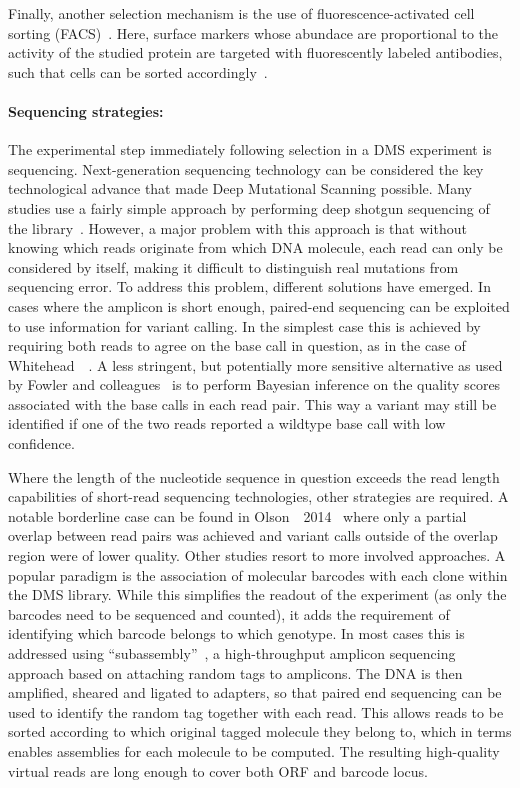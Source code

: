 Finally, another selection mechanism is the use of fluorescence-activated cell sorting (FACS)~. Here, surface markers whose abundace are proportional to the activity of the studied protein are targeted with fluorescently labeled antibodies, such that cells can be sorted accordingly~\cite{schlinkmann_critical_2012,majithia_prospective_2016}.


\paragraph{Sequencing strategies:} The experimental step immediately following selection in a DMS experiment is sequencing. Next-generation sequencing technology can be considered the key technological advance that made Deep Mutational Scanning possible. Many studies use a fairly simple approach by performing deep shotgun sequencing of the library~\cite{ernst_coevolution_2010,hietpas_experimental_2011,fujino_robust_2012}. However, a major problem with this approach is that without knowing which reads originate from which DNA molecule, each read can only be considered by itself, making it difficult to distinguish real mutations from sequencing error. To address this problem, different solutions have emerged. In cases where the amplicon is short enough, paired-end sequencing can be exploited to use information for variant calling. In the simplest case this is achieved by requiring both reads to agree on the base call in question, as in the case of Whitehead~\etal~\cite{whitehead_optimization_2012}. A less stringent, but potentially more sensitive alternative as used by Fowler and colleagues~\cite{fowler_high-resolution_2010} is to perform Bayesian inference on the quality scores associated with the base calls in each read pair. This way a variant may still be identified if one of the two reads reported a wildtype base call with low confidence. 

Where the length of the nucleotide sequence in question exceeds the read length capabilities of short-read sequencing technologies, other strategies are required. A notable borderline case can be found in Olson~\etal~2014~\cite{olson_comprehensive_2014} where only a partial overlap between read pairs was achieved and variant calls outside of the overlap region were of lower quality. Other studies resort to more involved approaches. A popular paradigm is the association of molecular barcodes with each clone within the DMS library. While this simplifies the readout of the experiment (as only the barcodes need to be sequenced and counted), it adds the requirement of identifying which barcode belongs to which genotype. In most cases this is addressed using ``subassembly''~\cite{hiatt_parallel_2010}, a high-throughput amplicon sequencing approach based on attaching random tags to amplicons. The DNA is then amplified, sheared and ligated to adapters, so that paired end sequencing can be used to identify the random tag together with each read. This allows reads to be sorted according to which original tagged molecule they belong to, which in terms enables assemblies for each molecule to be computed. The resulting high-quality virtual reads are long enough to cover both ORF and barcode locus.

